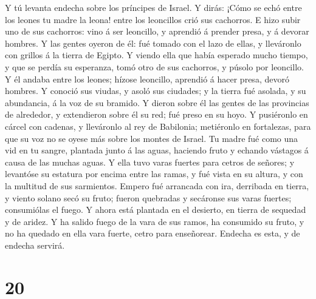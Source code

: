  Y tú levanta endecha sobre los príncipes de Israel.
 Y dirás: ¡Cómo se echó entre los leones tu madre la
leona! entre los leoncillos crió sus cachorros.  E hizo
subir uno de sus cachorros: vino á ser leoncillo, y aprendió á prender
presa, y á devorar hombres.  Y las gentes oyeron de él:
fué tomado con el lazo de ellas, y lleváronlo con grillos á la tierra de
Egipto.  Y viendo ella que había esperado mucho tiempo, y
que se perdía su esperanza, tomó otro de sus cachorros, y púsolo por
leoncillo.  Y él andaba entre los leones; hízose
leoncillo, aprendió á hacer presa, devoró hombres.  Y
conoció sus viudas, y asoló sus ciudades; y la tierra fué asolada, y su
abundancia, á la voz de su bramido.  Y dieron sobre él las
gentes de las provincias de alrededor, y extendieron sobre él su red;
fué preso en su hoyo.  Y pusiéronlo en cárcel con cadenas,
y lleváronlo al rey de Babilonia; metiéronlo en fortalezas, para que su
voz no se oyese más sobre los montes de Israel.  Tu madre
fué como una vid en tu sangre, plantada junto á las aguas, haciendo
fruto y echando vástagos á causa de las muchas aguas.  Y
ella tuvo varas fuertes para cetros de señores; y levantóse su estatura
por encima entre las ramas, y fué vista en su altura, y con la multitud
de sus sarmientos.  Empero fué arrancada con ira,
derribada en tierra, y viento solano secó su fruto; fueron quebradas y
secáronse sus varas fuertes; consumiólas el fuego.  Y
ahora está plantada en el desierto, en tierra de sequedad y de aridez.
 Y ha salido fuego de la vara de sus ramos, ha consumido
su fruto, y no ha quedado en ella vara fuerte, cetro para enseñorear.
Endecha es esta, y de endecha servirá.

\hypertarget{section-19}{%
\section{20}\label{section-19}}

